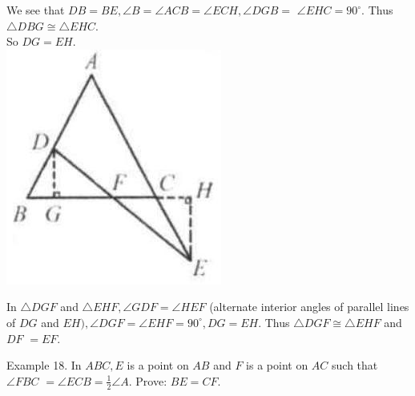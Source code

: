 \documentclass[10pt]{article}
\begin{document}
We see that \(D B=B E, \angle B=\angle A C B=\angle E C H, \angle D G B=\) \(\angle E H C=90^{\circ}\). Thus \(\triangle D B G \cong \triangle E H C\).\\
So \(D G=E H\).\\
\includegraphics[max width=\textwidth, center]{2025_04_17_97bc1f7e44d93c271a88g-084(1)}


In \(\triangle D G F\) and \(\triangle E H F, \angle G D F=\angle H E F\) (alternate interior angles of parallel lines of \(D G\) and \(E H), \angle D G F=\angle E H F=90^{\circ}, D G=E H\). Thus \(\triangle D G F \cong \triangle E H F\) and \(D F\) \(=E F\).

Example 18. In \(A B C, E\) is a point on \(A B\) and \(F\) is a point on \(A C\) such that \(\angle F B C\) \(=\angle E C B=\frac{1}{2} \angle A\). Prove: \(B E=C F\).
\end{document}
